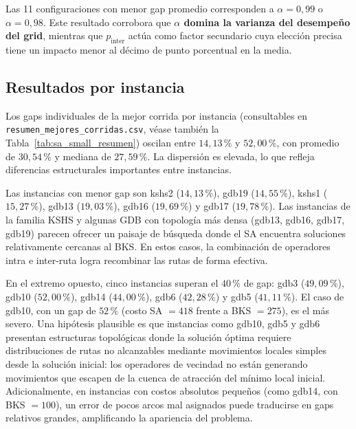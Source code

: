 Las 11 configuraciones con menor gap promedio corresponden a \(\alpha = 0{,}99\) o
\(\alpha = 0{,}98\). Este resultado corrobora que \textbf{\(\alpha\) domina la varianza
del desempeño del grid}, mientras que \(p_{\text{inter}}\) actúa como factor secundario
cuya elección precisa tiene un impacto menor al décimo de punto porcentual en la media.

\subsection{Resultados por instancia}
\label{subsec:resultados_instancia}

Los gaps individuales de la mejor corrida por instancia (consultables en
\texttt{resumen\_mejores\_corridas.csv}, véase también la
Tabla~\ref{tab:sa_small_resumen}) oscilan entre \textbf{\(14{,}13\,\%\)} y
\textbf{\(52{,}00\,\%\)}, con promedio de \(30{,}54\,\%\) y mediana de
\(27{,}59\,\%\). La dispersión es elevada, lo que refleja diferencias estructurales
importantes entre instancias.

Las instancias con menor gap son kshs2 (\(14{,}13\,\%\)), gdb19 (\(14{,}55\,\%\)),
kshs1 (\(15{,}27\,\%\)), gdb13 (\(19{,}03\,\%\)), gdb16 (\(19{,}69\,\%\)) y gdb17
(\(19{,}78\,\%\)). Las instancias de la familia KSHS y algunas GDB con topología más
densa (gdb13, gdb16, gdb17, gdb19) parecen ofrecer un paisaje de búsqueda donde el SA
encuentra soluciones relativamente cercanas al BKS. En estos casos, la combinación de
operadores intra e inter-ruta logra recombinar las rutas de forma efectiva.

En el extremo opuesto, cinco instancias superan el \(40\,\%\) de gap: gdb3
(\(49{,}09\,\%\)), gdb10 (\(52{,}00\,\%\)), gdb14 (\(44{,}00\,\%\)), gdb6
(\(42{,}28\,\%\)) y gdb5 (\(41{,}11\,\%\)). El caso de gdb10, con un gap de
\(52\,\%\) (costo SA \(= 418\) frente a BKS \(= 275\)), es el más severo. Una
hipótesis plausible es que instancias como gdb10, gdb5 y gdb6 presentan estructuras
topológicas donde la solución óptima requiere distribuciones de rutas no alcanzables
mediante movimientos locales simples desde la solución inicial: los operadores de
vecindad no están generando movimientos que escapen de la cuenca de atracción del
mínimo local inicial. Adicionalmente, en instancias con costos absolutos pequeños
(como gdb14, con BKS \(= 100\)), un error de pocos arcos mal asignados puede
traducirse en gaps relativos grandes, amplificando la apariencia del problema.

